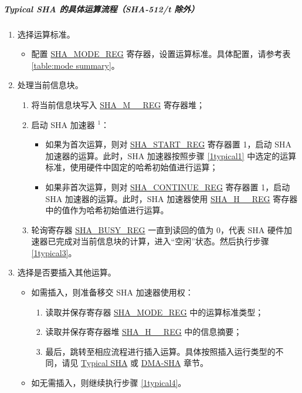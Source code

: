 \documentclass[main\_\_CN.tex]{subfiles}
\begin{document}
\subparagraph{Typical SHA 的具体运算流程（SHA-512/{\it{t}} 除外）}
\begin{enumerate}
    \item 选择运算标准。\label{1typical1}
        \begin{itemize}
            \item 配置 \hyperref[regdesc:SHAMODEREG]{SHA\_MODE\_REG} 寄存器，设置运算标准。具体配置，请参考表 \ref{table:mode summary}。
        \end{itemize}
    \item 处理当前信息块。\label{1typical2}
        \begin{enumerate}
            \item 将当前信息块写入 \hyperref[regdesc:SHAMNREG]{SHA\_M\_\_REG} 寄存器堆；
            \item 启动 SHA 加速器 \hyperref[note1]{$^1$}：
            \begin{itemize}
                \item 如果为首次运算，则对 \hyperref[regdesc:SHASTARTREG]{SHA\_START\_REG} 寄存器置 1，启动 SHA 加速器的运算。此时，SHA 加速器按照步骤 \ref{1typical1} 中选定的运算标准，使用硬件中固定的哈希初始值进行运算；
                \item 如果非首次运算，则对 \hyperref[regdesc:SHACONTINUEREG]{SHA\_CONTINUE\_REG} 寄存器置 1，启动 SHA 加速器的运算。此时，SHA 加速器使用 \hyperref[regdesc:SHAHNREG]{SHA\_H\_\_REG} 寄存器中的值作为哈希初始值进行运算。
            \end{itemize}
            \item 轮询寄存器 \hyperref[regdesc:SHABUSYREG]{SHA\_BUSY\_REG} 一直到读回的值为 0，代表 SHA 硬件加速器已完成对当前信息块的计算，进入“空闲”状态。然后执行步骤 \ref{1typical3}。
        \end{enumerate}
    \item \label{1typical3} 选择是否要插入其他运算。
        \begin{itemize}
            \item 如需插入，则准备移交 SHA 加速器使用权：
            \begin{enumerate}
            \item 读取并保存寄存器 \hyperref[regdesc:SHAMODEREG]{SHA\_MODE\_REG} 中的运算标准类型；
            \item 读取并保存寄存器堆 \hyperref[regdesc:SHAHNREG]{SHA\_H\_\_REG} 中的信息摘要；
            \item 最后，跳转至相应流程进行插入运算。具体按照插入运行类型的不同，请见 \hyperref[subsection:typicalsha]{Typical SHA} 或 \hyperref[subsection:dma-sha]{DMA-SHA} 章节。
            \end{enumerate}
            \item 如无需插入，则继续执行步骤 \ref{1typical4}。
        \end{itemize}


\end{enumerate}
\end{document}

